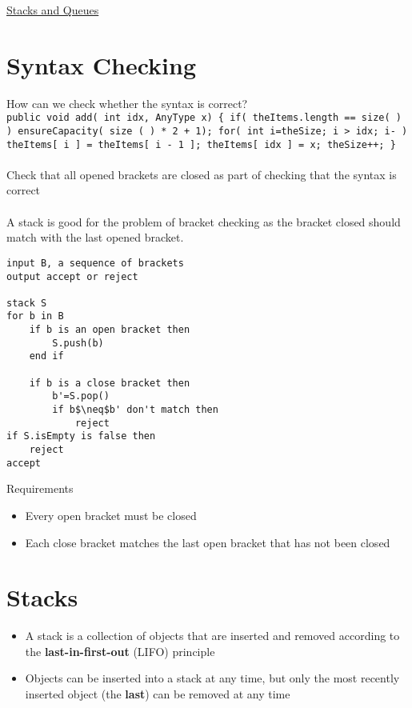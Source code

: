 \documentclass{article}[18pt]
\begin{document}
\begin{center}
\underline{\huge Stacks and Queues}
\end{center}
\section{Syntax Checking}
How can we check whether the syntax is correct?\\
\texttt{public void add( int idx, AnyType x)
\{ if( theItems.length == size( ) )
ensureCapacity( size ( ) * 2 + 1); for( int
i=theSize; i > idx; i- ) theItems[ i ] =
theItems[ i - 1 ]; theItems[ idx ] = x;
theSize++; \}  }\\
\\
Check that all opened brackets are closed as part of checking that the syntax is correct\\
\\
A stack is good for the problem of bracket checking as the bracket closed should match with the last opened bracket.
\begin{lstlisting}[mathescape=true]
input B, a sequence of brackets
output accept or reject

stack S
for b in B
	if b is an open bracket then
		S.push(b)
	end if	
	
	if b is a close bracket then
		b'=S.pop()
		if b$\neq$b' don't match then
			reject
if S.isEmpty is false then
	reject
accept
\end{lstlisting}
Requirements
\begin{itemize}
\item Every open bracket must be closed
\item Each close bracket matches the last open bracket that has not been closed
\end{itemize}
\section{Stacks}
\begin{itemize}
\item A stack is a collection of objects that are inserted and removed according to the \textbf{last-in-first-out} (LIFO) principle
\item Objects can be inserted into a stack at any time, but only the most recently inserted object (the \textbf{last}) can be removed at any time
\end{itemize}
\end{document}

